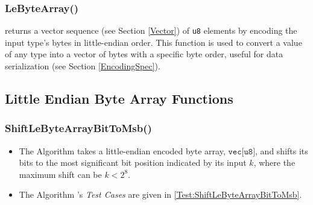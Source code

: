 \documentclass[../alan-handbook.tex]{subfiles}
\begin{document}
\subsubsection{LeByteArray()} \label{LeByteArray}

 returns a vector sequence (see Section \ref{Vector}) of \texttt{u8} elements by encoding the input type's bytes in little-endian order. This function is used to convert a value of any type into a vector of bytes with a specific byte order, useful for data serialization (see Section \ref{EncodingSpec}).

\subsection{Little Endian Byte Array Functions} \label{SupplementaryLeByteArrayFunctions}

\subsubsection{ShiftLeByteArrayBitToMsb()} \label{ShiftLeByteArrayBitToMsb}

\begin{itemize}
    \item The Algorithm  takes a little-endian encoded byte array, $\texttt{vec[u8]}$, and shifts its bits to the most significant bit position indicated by its input $k$, where the maximum shift can be $k < 2^8$.
    \item The Algorithm 's \textit{Test Cases} are given in \ref{Test:ShiftLeByteArrayBitToMsb}.
\end{itemize}
\end{document}
